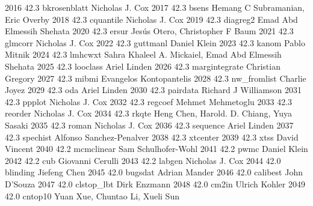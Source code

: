   2016     42.3    bkrosenblatt  Nicholas J. Cox                         
  2017     42.3    bsens         Hemang C Subramanian, Eric Overby       
  2018     42.3    cquantile     Nicholas J. Cox                         
  2019     42.3    diagreg2      Emad Abd Elmessih Shehata               
  2020     42.3    ersur         Jesús Otero, Christopher F Baum        
  2021     42.3    glmcorr       Nicholas J. Cox                         
  2022     42.3    guttmanl      Daniel Klein                            
  2023     42.3    kanom         Pablo Mitnik                            
  2024     42.3    lmhcwxt       Sahra Khaleel A. Mickaiel, Emad Abd     
                                   Elmessih Shehata                        
  2025     42.3    looclass      Ariel Linden                            
  2026     42.3    margintegrate  Christian Gregory                       
  2027     42.3    mibmi         Evangelos Kontopantelis                 
  2028     42.3    nw_fromlist   Charlie Joyez                           
  2029     42.3    oda           Ariel Linden                            
  2030     42.3    pairdata      Richard J Williamson                    
  2031     42.3    ppplot        Nicholas J. Cox                         
  2032     42.3    regcoef       Mehmet Mehmetoglu                       
  2033     42.3    reorder       Nicholas J. Cox                         
  2034     42.3    rkqte         Heng Chen, Harold. D. Chiang, Yuya      
                                   Sasaki                                  
  2035     42.3    roman         Nicholas J. Cox                         
  2036     42.3    sequence      Ariel Linden                            
  2037     42.3    spechist      Alfonso Sanchez-Penalver                
  2038     42.3    xtcenter                                              
  2039     42.3    xtss          David Vincent                           
  2040     42.2    mcmclinear    Sam Schulhofer-Wohl                     
  2041     42.2    pwmc          Daniel Klein                            
  2042     42.2    cub           Giovanni Cerulli                        
  2043     42.2    labgen        Nicholas J. Cox                         
  2044     42.0    blinding      Jiefeng Chen                            
  2045     42.0    bugsdat       Adrian Mander                           
  2046     42.0    calibest      John D'Souza                            
  2047     42.0    clstop_lbt    Dirk Enzmann                            
  2048     42.0    cm2in         Ulrich Kohler                           
  2049     42.0    cntop10       Yuan Xue, Chuntao Li, Xueli Sun         
